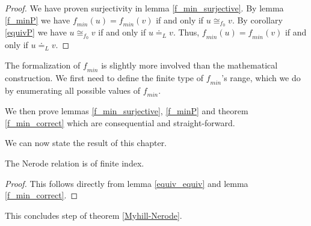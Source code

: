 \begin{proof}
    We have proven surjectivity in lemma \ref{f_min_surjective}. 
    By lemma \ref{f_minP} we have $\mathit{f_{min}}(u) = \mathit{f_{min}}(v)$ if and only if $u \cong_{f_0} v$.
    By corollary \ref{equivP} we have $u \cong_{f_0} v$ if and only if $u \doteq_L v$.
    Thus, $\mathit{f_{min}}(u) = \mathit{f_{min}}(v)$ if and only if $u \doteq_L v$.
\end{proof}


The formalization of $\mathit{f_{min}}$ is slightly more involved than the mathematical construction. 
We first need to define the finite type of $\mathit{f_{min}}$'s range, 
which we do by enumerating all possible values of $\mathit{f_{min}}$.



We then prove lemmas \ref{f_min_surjective}, \ref{f_minP} and theorem \ref{f_min_correct} which are consequential and straight-forward.



We can now state the result of this chapter. 

\begin{corollary}
    The Nerode relation is of finite index.
\end{corollary}
\begin{proof}
    This follows directly from lemma \ref{equiv_equiv} and lemma \ref{f_min_correct}.
\end{proof}



This concludes step  of theorem \ref{Myhill-Nerode}. 


